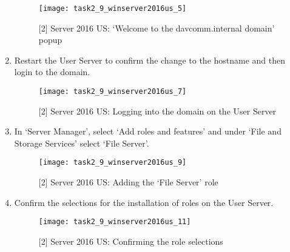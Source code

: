 \begin{enumerate}[series=task2methodology4]
    \begin{figure}[H]
      \centering
      \captionsetup{skip=2pt}
      \texttt{[image: task2\_9\_winserver2016us\_5]}
      \caption{[2] Server 2016 US: `Welcome to the davcomm.internal domain' popup}
      \label{fig:task2:vspherec_us5}
    \end{figure}
  \item Restart the User Server to confirm the change to the hostname and then login to the domain.
    \begin{figure}[H]
      \centering
      \captionsetup{skip=2pt}
      \texttt{[image: task2\_9\_winserver2016us\_7]}
      \caption{[2] Server 2016 US: Logging into the domain on the User Server}
      \label{fig:task2:vspherec_us7}
    \end{figure}
  \item In `Server Manager', select `Add roles and features' and under `File and Storage Services' select `File Server'.
    \begin{figure}[H]
      \centering
      \captionsetup{skip=2pt}
      \texttt{[image: task2\_9\_winserver2016us\_9]}
      \caption{[2] Server 2016 US: Adding the `File Server' role}
      \label{fig:task2:vspherec_us9}
    \end{figure}
  \item Confirm the selections for the installation of roles on the User Server.
    \begin{figure}[H]
      \centering
      \captionsetup{skip=2pt}
      \texttt{[image: task2\_9\_winserver2016us\_11]}
      \caption{[2] Server 2016 US: Confirming the role selections}
      \label{fig:task2:vspherec_us11}
    \end{figure}
\end{enumerate}
